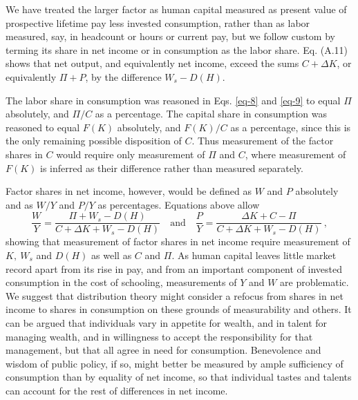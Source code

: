 \documentclass[a4paper,fleqn]{cas-sc}
\begin{document}

We have treated the larger factor as human capital measured as present value of prospective lifetime pay less invested consumption, rather than as labor measured, say, in headcount or hours or current pay, but we follow custom by terming its share in net income or in consumption as the labor share. Eq. (A.11) shows that net output, and equivalently net income, exceed the sums $C + \Delta K$, or equivalently $\Pi + P$, by the difference $W_s - D(H)$.

The labor share in consumption was reasoned in Eqs. \eqref{eq-8} and \eqref{eq-9} to equal $\Pi$ absolutely, and $\Pi / C$ as a percentage. The capital share in consumption was reasoned to equal $F(K)$ absolutely, and $F(K)/C$ as a percentage, since this is the only remaining possible disposition of $C$. Thus measurement of the factor shares in $C$ would require only measurement of $\Pi$ and $C$, where measurement of $F(K)$ is inferred as their difference rather than measured separately.

Factor shares in net income, however, would be defined as $W$ and $P$ absolutely and as $W/Y$ and $P/Y$ as percentages. Equations above allow
\begin{equation}
\frac{W}{Y} = \frac{\Pi + W_s - D(H)}{C + \Delta K + W_s - D(H)} \quad  \text{and} \quad \frac{P}{Y} = \frac{\Delta K + C - \Pi}{C + \Delta K + W_s - D(H)} \ , \label{eq-a13}
\end{equation}
showing that measurement of factor shares in net income require measurement of $K,\ W_s$ and $D(H)$ as well as $C$ and $\Pi$. As human capital leaves little market record apart from its rise in pay, and from an important component of invested consumption in the cost of schooling, measurements of $Y$ and $W$ are problematic. We suggest that distribution theory might consider a refocus from shares in net income to shares in consumption on these grounds of measurability and others. It can be argued that individuals vary in appetite for wealth, and in talent for managing wealth, and in willingness to accept the responsibility for that management, but that all agree in need for consumption. Benevolence and wisdom of public  policy, if so, might better be measured by ample sufficiency of consumption than by equality of net income, so that individual tastes and talents can account for the rest of differences in net income.
\end{document}
